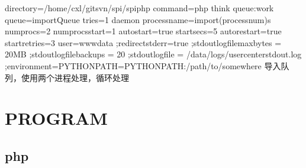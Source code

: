 \documentclass[a4paper,10pt,english]{sphinxmanual}
\begin{document}
\begin{itemize}
\begin{sphinxVerbatim}
directory=/home/cxl/git\PYGZhy{}svn/spi/spi\PYGZhy{}php
command=php think queue:work \PYGZhy{}\PYGZhy{}queue=\PYGZdq{}importQueue\PYGZdq{} \PYGZhy{}\PYGZhy{}tries=1 \PYGZhy{}\PYGZhy{}daemon
process\PYGZus{}name=import\PYGZus{}\PYGZpc{}(process\PYGZus{}num)s
numprocs=2
numprocs\PYGZus{}start=1
autostart=true
startsecs=5
autorestart=true
startretries=3
user=www\PYGZhy{}data
;redirect\PYGZus{}stderr=true
;stdout\PYGZus{}logfile\PYGZus{}maxbytes = 20MB
;stdout\PYGZus{}logfile\PYGZus{}backups = 20
;stdout\PYGZus{}logfile = /data/logs/usercenter\PYGZus{}stdout.log
;environment=PYTHONPATH=\PYGZdl{}PYTHONPATH:/path/to/somewhere
导入队列，使用两个进程处理，循环处理
\end{sphinxVerbatim}

\end{itemize}


\chapter{PROGRAM}
\label{\detokenize{program/index:program}}\label{\detokenize{program/index::doc}}

\section{php}
\label{\detokenize{program/php:php}}\label{\detokenize{program/php::doc}}
\end{document}
